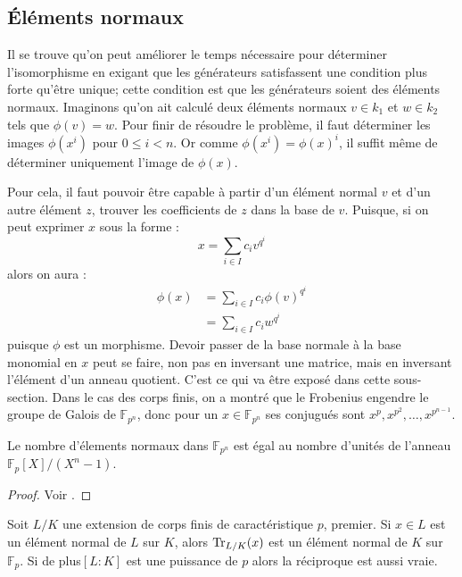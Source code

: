 \documentclass[a4paper]{article} %
\numberwithin{section}{part}
\numberwithin{equation}{section}
\newcommand\GF[1]{\mathbb{F}_{#1}}
\begin{document}
\subsection{Éléments normaux}
\label{sec:elemnorm}
Il se trouve qu'on peut améliorer le temps nécessaire pour déterminer
l'isomorphisme en exigant que les générateurs satisfassent une condition plus 
forte qu'être unique; cette condition est que les générateurs soient des 
éléments normaux. Imaginons qu'on ait calculé deux éléments normaux $v\in k_1$ 
et $w\in k_2$ tels que $\phi(v) = w$. Pour finir de résoudre le problème, il 
faut déterminer les images $\phi(x^i)$ pour $0\leq i < n$. Or comme $\phi(x^i) =
\phi(x)^i$, il suffit même de déterminer uniquement l'image de $\phi(x)$.\par
Pour cela, il faut pouvoir être capable à partir d'un élément normal $v$ et d'un
autre élément $z$, trouver les coefficients de $z$ dans la base de $v$. Puisque,
si on peut exprimer $x$ sous la forme :
\[x = \sum_{i\in I}{c_iv^{q^i}}\]
alors on aura :
\begin{align*}
\phi(x) &= \sum_{i\in I}{c_i\phi(v)^{q^i}}\\
&= \sum_{i\in I}{c_iw^{q^i}}
\end{align*}
puisque $\phi$ est un morphisme. Devoir passer de la base normale à la base 
monomial en $x$ peut se faire, non pas en inversant une matrice, mais en 
inversant l'élément d'un anneau quotient. C'est ce qui va être exposé dans cette
sous-section. Dans le cas des corps finis, on a montré que le Frobenius engendre
le groupe de Galois de $\GF{p^n}$, donc pour un $x\in\GF{p^n}$ ses conjugués 
sont $x^p, x^{p^2},\dots,x^{p^{n-1}}$. 
\begin{thm}
\label{th:nbelemnorm}
Le nombre d'élements normaux dans $\GF{p^n}$ est égal au nombre d'unités de
l'anneau $\GF{p}[X]/(X^n - 1)$.
\end{thm}
\begin{proof}
Voir \cite[th. 3.73]{LiNi2}.
\end{proof}
\begin{cor}
\label{cor:tracenorm}
Soit $L/K$ une extension de corps finis de caractéristique $p$, premier. Si
$x\in L$ est un élément normal de $L$ sur $K$, alors $\textup{Tr}_{L/K}(x)$ est 
un élément normal de $K$ sur $\GF{p}$. Si de plus$[L:K]$ est une puissance de 
$p$ alors la réciproque est aussi vraie.
\end{cor}
\end{document}
